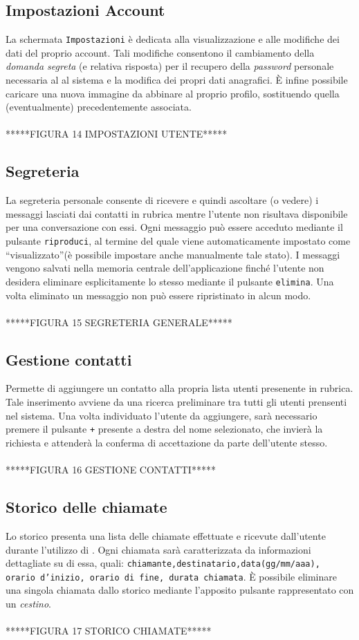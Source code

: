 \subsection{Impostazioni Account}
La schermata \texttt{Impostazioni} è dedicata alla visualizzazione e alle modifiche dei dati del proprio account. Tali modifiche consentono il cambiamento della \textit{domanda segreta} (e relativa risposta) per il recupero della \textit{password} personale necessaria al \underline{} al sistema e la modifica dei propri dati anagrafici.
È infine possibile caricare una nuova immagine da abbinare al proprio profilo, sostituendo quella (eventualmente) precedentemente associata.
\\\\*****FIGURA 14 IMPOSTAZIONI UTENTE*****
 
\subsection{Segreteria}
La segreteria personale consente di ricevere e quindi ascoltare (o vedere) i messaggi lasciati dai contatti in rubrica mentre l'utente non risultava disponibile per una conversazione con essi.
Ogni messaggio può essere acceduto mediante il pulsante \texttt{riproduci}, al termine del quale viene automaticamente impostato come ``visualizzato''(è possibile impostare anche manualmente tale stato).
I messaggi vengono salvati nella memoria centrale dell'applicazione \caName{} finché l'utente non desidera eliminare esplicitamente lo stesso mediante il pulsante \texttt{elimina}. Una volta eliminato un messaggio non può essere ripristinato in alcun modo.
\\\\*****FIGURA 15 SEGRETERIA GENERALE*****

\subsection{Gestione contatti}
Permette di aggiungere un contatto alla propria lista utenti presenente in rubrica. Tale inserimento avviene da una ricerca preliminare tra tutti gli utenti prensenti nel sistema. Una volta individuato l'utente da aggiungere, sarà necessario premere il pulsante \texttt{+} presente a destra del nome selezionato, che invierà la richiesta e attenderà la conferma di accettazione da parte dell'utente stesso.
\\\\*****FIGURA 16 GESTIONE CONTATTI*****
\subsection{Storico delle chiamate}
Lo storico presenta una lista delle chiamate effettuate e ricevute dall'utente durante l'utilizzo di \caName{}. Ogni chiamata sarà caratterizzata da informazioni dettagliate su di essa, quali: \texttt{chiamante,destinatario,data(gg/mm/aaa), orario d'inizio, orario di fine, durata chiamata}.
È possibile eliminare una singola chiamata dallo storico mediante l'apposito pulsante rappresentato con un \textit{cestino}.
\\\\*****FIGURA 17 STORICO CHIAMATE*****
